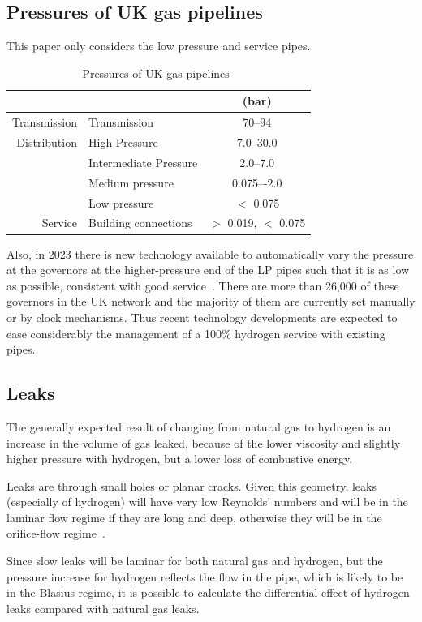 \documentclass[5p]{elsarticle} %
\begin{document}
\subsection{Pressures of UK gas pipelines}
This paper only considers the low pressure and service pipes.
\begin{table}[htb]
\caption{\label{tab:pipeline}Pressures of UK gas pipelines~\citep{dodds2013}}
\begin{tabular}{r|l|c}
 & & (bar) \\\hline
Transmission & Transmission& 70--94\\
\hline
Distribution & High Pressure & 7.0--30.0\\
& Intermediate Pressure & 2.0--7.0\\
& Medium pressure &	0.075–-2.0\\
& Low pressure & $<$ 0.075\\
\hline
Service & Building connections & $>$ 0.019, $<$ 0.075
\end{tabular}
\end{table}




Also, in 2023 there is new technology available to automatically vary the pressure at the governors at the higher-pressure end of the LP pipes such that it is as low as possible, consistent with good service~\citep{utonomy23}. 
There are more than 26,000 of these governors in the UK network and the majority of them are currently set manually or by clock mechanisms. 
Thus recent technology developments are expected to ease considerably  the management of a 100\% hydrogen service with existing pipes.

\subsection{Leaks}
\label{leaks}
The generally expected result of changing from natural gas to hydrogen is an increase in the volume of gas leaked, because of the lower viscosity and slightly higher pressure with hydrogen, but a lower loss of combustive energy. 

Leaks are through small holes or planar cracks. Given this geometry, leaks (especially of hydrogen) will have very low Reynolds' numbers and will be in the laminar flow regime if they are long and deep, otherwise they will be in the orifice-flow regime~\citep{Plascencia2020}.

Since slow leaks will be laminar for both natural gas and hydrogen, but the pressure increase for hydrogen reflects the flow in the pipe, which is likely to be in the Blasius regime, it is possible to calculate the differential effect of hydrogen leaks compared with natural gas leaks.
\end{document}
